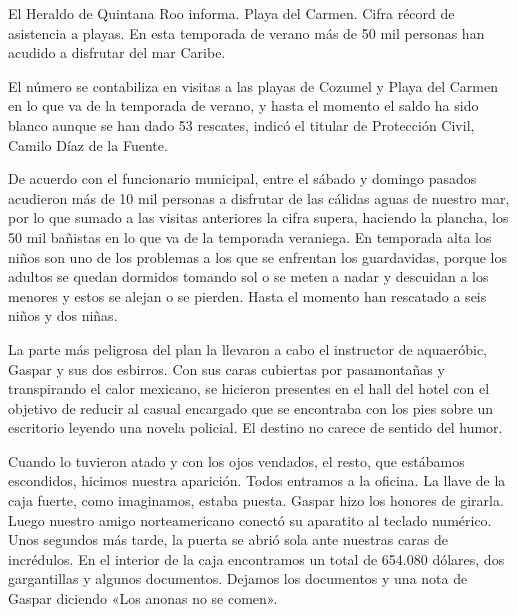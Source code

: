 \documentclass[12pt,twoside,openright,a5paper]{book}
\begin{document}
El Heraldo de Quintana Roo informa. Playa del Carmen. Cifra récord de
asistencia a playas. En esta temporada de verano más de 50 mil personas
han acudido a disfrutar del mar Caribe.

El número se contabiliza en visitas a las playas de Cozumel y Playa
del Carmen en lo que va de la temporada de verano, y hasta el momento el
saldo ha sido blanco aunque se han dado 53 rescates, indicó el titular de
Protección Civil, Camilo Díaz de la Fuente.

De acuerdo con el funcionario municipal, entre el sábado y domingo pasados
acudieron más de 10 mil personas a disfrutar de las cálidas aguas de
nuestro mar, por lo que sumado a las visitas anteriores la cifra supera,
haciendo la plancha, los 50 mil bañistas en lo que va de la temporada
veraniega. En temporada alta los niños
son uno de los problemas a los que se enfrentan los guardavidas, porque
los adultos se quedan dormidos tomando sol o se meten a nadar y descuidan a
los menores y estos se alejan o se pierden. Hasta el momento han rescatado
a seis niños y dos niñas.

\vspace{0.5cm}
\afterpage{}
\hrulefill\hspace{0.2cm} \decofourleft\decofourright \hspace{0.2cm} \hrulefill
\vspace{0.5cm}

La parte más peligrosa del plan la llevaron a cabo el instructor de
aquaeróbic, Gaspar y sus dos esbirros. Con sus caras cubiertas por
pasamontañas y transpirando el calor mexicano, se hicieron presentes en
el hall del hotel con el objetivo de reducir al casual encargado que se
encontraba con los pies sobre un escritorio leyendo una novela policial. El
destino no carece de sentido del humor.

Cuando lo tuvieron atado y con los ojos vendados, el resto, que estábamos
escondidos, hicimos nuestra aparición. Todos entramos a la oficina.  La llave
de la caja fuerte, como imaginamos, estaba puesta. Gaspar hizo los honores
de girarla. Luego nuestro amigo norteamericano conectó su aparatito al
teclado numérico. Unos segundos más tarde, la puerta se abrió sola ante
nuestras caras de incrédulos. En el interior de la caja encontramos un
total de 654.080 dólares, dos gargantillas y algunos documentos. Dejamos
los documentos y una nota de Gaspar diciendo «Los anonas no se comen».
\end{document}
